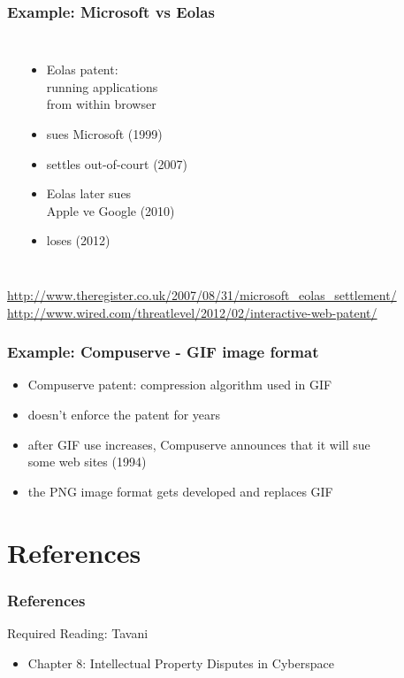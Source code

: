 \documentclass[dvipsnames]{beamer}
\theoremstyle{plain}
\begin{document}
\begin{frame}
  \frametitle{Example: Microsoft vs Eolas}

  \begin{columns}
    \begin{center}
    \end{center}

    \begin{itemize}
      \item Eolas patent:\\
        running applications\\
        from within browser
      \item sues Microsoft (1999)
      \item settles out-of-court (2007)

      \pause
      \medskip
      \item Eolas later sues\\
        Apple ve Google (2010)
      \item loses (2012)
    \end{itemize}
  \end{columns}

  \medskip
  \tiny{\url{http://www.theregister.co.uk/2007/08/31/microsoft_eolas_settlement/}}\\
  \tiny{\url{http://www.wired.com/threatlevel/2012/02/interactive-web-patent/}}\\
\end{frame}

\begin{frame}
  \frametitle{Example: Compuserve - GIF image format}

  \begin{itemize}
    \item Compuserve patent: compression algorithm used in GIF
    \item doesn't enforce the patent for years
    \item after GIF use increases, Compuserve announces that it will sue\\
      some web sites (1994)

    \pause
    \medskip
    \item the PNG image format gets developed and replaces GIF
  \end{itemize}
\end{frame}

\section*{References}

\begin{frame}
  \frametitle{References}

  \begin{block}{Required Reading: Tavani}
    \begin{itemize}
      \item Chapter 8: \alert{Intellectual Property Disputes in Cyberspace}
    \end{itemize}
  \end{block}
\end{frame}
\end{document}
